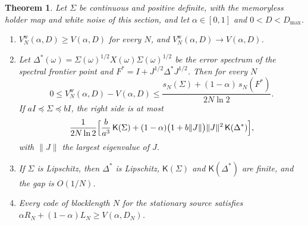 \documentclass[11pt,onecolumn]{IEEEtran}
\newtheorem{theorem}{Theorem}
\begin{document}
\begin{theorem}\label{thm:windows}
Let $\Sigma$ be continuous and positive definite, with the memoryless
holder map and white noise of this section, and let $\alpha\in[0,1]$ and
$0<D<D_{\max}$.
\begin{enumerate}
\item[(a)] $V^{\mathrm w}_N(\alpha,D)\ge V(\alpha,D)$ for every $N$, and
$V^{\mathrm w}_N(\alpha,D)\to V(\alpha,D)$.
\item[(b)] Let $\Delta^\ast(\omega)=\Sigma(\omega)^{1/2}X(\omega)\Sigma(\omega)^{1/2}$
be the error spectrum of the spectral frontier point and
$F^\ast=I+J^{1/2}\Delta^\ast J^{1/2}$. Then for every $N$
\[
0\le V^{\mathrm w}_N(\alpha,D)-V(\alpha,D)\le\frac{s_N(\Sigma)+(1-\alpha)\,s_N(F^\ast)}{2N\ln2}.
\]
If $aI\preceq\Sigma\preceq bI$, the right side is at most
\[
\frac1{2N\ln2}\Bigl[\frac b{a^3}\,\mathsf K(\Sigma)+(1-\alpha)\bigl(1+b\|J\|\bigr)\|J\|^2\,\mathsf K(\Delta^\ast)\Bigr],
\]
with $\|J\|$ the largest eigenvalue of $J$.
\item[(c)] If $\Sigma$ is Lipschitz, then $\Delta^\ast$ is Lipschitz,
$\mathsf K(\Sigma)$ and $\mathsf K(\Delta^\ast)$ are finite, and the gap is
$O(1/N)$.
\item[(d)] Every code of blocklength $N$ for the stationary source
satisfies $\alpha R_N+(1-\alpha)L_N\ge V(\alpha,D_N)$.
\end{enumerate}
\end{theorem}
\end{document}
